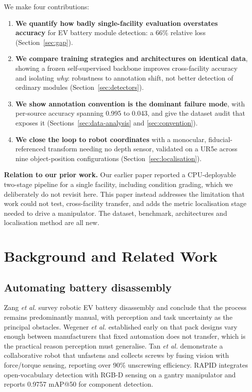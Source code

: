\documentclass[conference]{IEEEtran}
\begin{document}
We make four contributions:

\begin{enumerate}
\item \textbf{We quantify how badly single-facility evaluation overstates accuracy}
for EV battery module detection: a 66\% relative loss (Section~\ref{sec:gap}).
\item \textbf{We compare training strategies and architectures on identical data},
showing a frozen self-supervised backbone improves cross-facility accuracy and
isolating \emph{why}: robustness to annotation shift, not better detection of
ordinary modules (Section~\ref{sec:detectors}).
\item \textbf{We show annotation convention is the dominant failure mode}, with
per-source accuracy spanning 0.995 to 0.043, and give the dataset audit that exposes
it (Sections~\ref{sec:data-analysis} and \ref{sec:convention}).
\item \textbf{We close the loop to robot coordinates} with a monocular,
fiducial-referenced transform needing no depth sensor, validated on a UR5e across
nine object-position configurations (Section~\ref{sec:localisation}).
\end{enumerate}

\textbf{Relation to our prior work.} Our earlier paper \cite{katiyar2026mvml}
reported a CPU-deployable two-stage pipeline for a single facility, including
condition grading, which we deliberately do not revisit here. This paper instead
addresses the limitation that work could not test, cross-facility transfer, and adds
the metric localisation stage needed to drive a manipulator. The dataset, benchmark,
architectures and localisation method are all new.

\section{Background and Related Work}

\subsection{Automating battery disassembly}
Zang \emph{et al.} \cite{zang2024robotic} survey robotic EV battery disassembly and
conclude that the process remains predominantly manual, with perception and task
uncertainty as the principal obstacles. Wegener \emph{et al.} \cite{wegener2015}
established early on that pack designs vary enough between manufacturers that fixed
automation does not transfer, which is the practical reason perception must
generalise. Tan \emph{et al.} \cite{tan2025screws} demonstrate a collaborative robot
that unfastens and collects screws by fusing vision with force/torque sensing,
reporting over 90\% unscrewing efficiency. RAPID \cite{rapid2026} integrates
open-vocabulary detection with RGB-D sensing on a gantry manipulator and reports
0.9757 mAP@50 for component detection.
\end{document}
